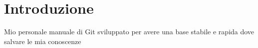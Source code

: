 \chapter{Introduzione}
Mio personale manuale di Git sviluppato per avere una base stabile e rapida dove salvare le mia conoscenze